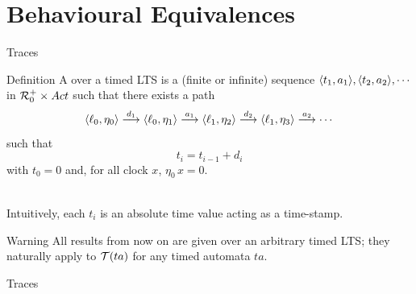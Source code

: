 \documentclass[aspectratio=169]{beamer}
\begin{document}



\frame[plain]{\titlepage}


\section{Behavioural Equivalences}

\begin{slide}{Traces}
\small

\begin{block}{Definition}
A  over a \alert{timed LTS} is a (finite or infinite) sequence  $\langle t_1,a_1 \rangle, \langle t_2,a_2 \rangle, \cdots$ in
 $\mathcal{R}^+_0 \times Act$ such that there exists a path
\begin{equation*}
\langle \ell_0,\eta_0 \rangle  \stackrel{d_1}{\longrightarrow}   \langle \ell_0,\eta_1 \rangle    \stackrel{a_1}{\longrightarrow}     \langle \ell_1,\eta_2 \rangle    \stackrel{d_2}{\longrightarrow}    \langle \ell_1,\eta_3 \rangle   \stackrel{a_2}{\longrightarrow} \cdots 
\end{equation*}
such that 
\begin{equation*}
t_{i} = t_{i-1} + d_i
\end{equation*}
with $t_0=0$ and, for all clock $x$, $\eta_0\, x = 0$.
\end{block}
~\\

Intuitively, each $t_i$ is an absolute time value acting as a \alert{time-stamp}.

\begin{alertblock}{Warning}
All results from now on are given over an arbitrary \alert{timed LTS}; they naturally apply to $\mathcal{T}(ta)$ for any timed automata $ta$.
\end{alertblock}
\end{slide}



\begin{frame}{Traces}
\end{frame}
\end{document}
